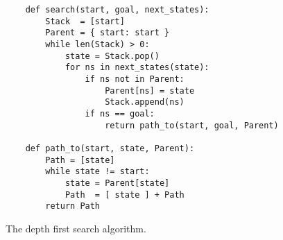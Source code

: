 \begin{figure}[!ht]
\centering
\begin{verbatim}
    def search(start, goal, next_states):
        Stack  = [start]
        Parent = { start: start }
        while len(Stack) > 0:
            state = Stack.pop()
            for ns in next_states(state):
                if ns not in Parent:
                    Parent[ns] = state
                    Stack.append(ns)
                if ns == goal:
                    return path_to(start, goal, Parent)
    
    def path_to(start, state, Parent):
        Path = [state]
        while state != start:
            state = Parent[state]
            Path  = [ state ] + Path
        return Path
\end{verbatim}
\vspace*{-0.3cm}
\caption{The depth first search algorithm.}
\label{fig:Depth-First-Search-Stack.ipynb}
\end{figure}


